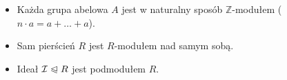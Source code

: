 \begin{eg}
    \begin{itemize}
        \item Każda grupa abelowa $A$ jest w naturalny sposób $\mathbb{Z}$-modułem ($n \cdot a = a + \dots + a$).
        \item Sam pierścień $R$ jest $R$-modułem nad samym sobą.
        \item Ideał $\mathcal{I} \trianglelefteqslant  R$ jest podmodułem $R$.
    \end{itemize}
\end{eg}
